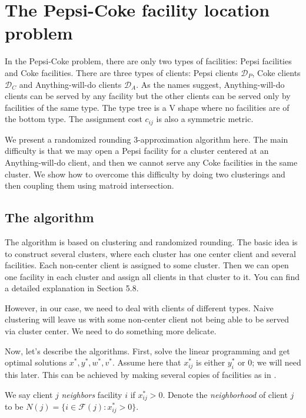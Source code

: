 \section{The Pepsi-Coke facility location problem}

In the Pepsi-Coke problem, there are only two types of facilities: Pepsi facilities and Coke facilities. There are three types of clients: Pepsi clients $\mathcal{D}_P$, Coke clients $\mathcal{D}_C$ and Anything-will-do clients $\mathcal{D}_A$. As the names suggest, Anything-will-do clients can be served by any facility but the other clients can be served only by facilities of the same type. The type tree is a V shape where no facilities are of the bottom type. The assignment cost $c_{ij}$ is also a symmetric metric.

We present a randomized rounding 3-approximation algorithm here. The main difficulty is that we may open a Pepsi facility for a cluster centered at an Anything-will-do client, and then we cannot serve any Coke facilities in the same cluster. We show how to overcome this difficulty by doing two clusterings and then coupling them using matroid intersection.

\subsection{The algorithm}

The algorithm is based on clustering and randomized rounding. The basic idea is to construct several clusters, where each cluster has one center client and several facilities. Each non-center client is assigned to some cluster. Then we can open one facility in each cluster and assign all clients in that cluster to it. You can find a detailed explanation in \cite{williamson2011design} Section 5.8.

However, in our case, we need to deal with clients of different types. Naive clustering will leave us with some non-center client not being able to be served via cluster center. We need to do something more delicate.

Now, let's describe the algorithms. First, solve the linear programming and get optimal solutions $x^*, y^*, w^*, v^*$. Assume here that $x^*_{ij}$ is either $y^*_i$ or $0$; we will need this later. This can be achieved by making several copies of facilities as in \cite{chudak2003improved}.

\begin{defn}
We say client $j$ {\it neighbors} facility $i$ if $x^*_{ij} > 0$.
Denote the {\it neighborhood} of client $j$ to be $N(j) = \{i \in \mathcal{F}(j) : x^*_{ij} > 0 \}$.
\end{defn}

